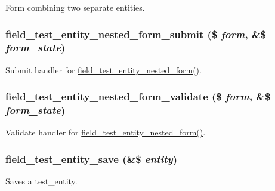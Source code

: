 \label{field__test_8entity_8inc_a8161d4c3065234379c6d6379ad71afbd}
Form combining two separate entities. \hypertarget{field__test_8entity_8inc_a2610999ccc4c08b9dc7c4ab45d1db366}{
\subsubsection[{field\_\-test\_\-entity\_\-nested\_\-form\_\-submit}]{\setlength{\rightskip}{0pt plus 5cm}field\_\-test\_\-entity\_\-nested\_\-form\_\-submit (\$ {\em form}, \/  \&\$ {\em form\_\-state})}}
\label{field__test_8entity_8inc_a2610999ccc4c08b9dc7c4ab45d1db366}
Submit handler for \hyperlink{field__test_8entity_8inc_a8161d4c3065234379c6d6379ad71afbd}{field\_\-test\_\-entity\_\-nested\_\-form()}. \hypertarget{field__test_8entity_8inc_a526966c6b74e25b6a5aa0b283f6a35a7}{
\subsubsection[{field\_\-test\_\-entity\_\-nested\_\-form\_\-validate}]{\setlength{\rightskip}{0pt plus 5cm}field\_\-test\_\-entity\_\-nested\_\-form\_\-validate (\$ {\em form}, \/  \&\$ {\em form\_\-state})}}
\label{field__test_8entity_8inc_a526966c6b74e25b6a5aa0b283f6a35a7}
Validate handler for \hyperlink{field__test_8entity_8inc_a8161d4c3065234379c6d6379ad71afbd}{field\_\-test\_\-entity\_\-nested\_\-form()}. \hypertarget{field__test_8entity_8inc_adb618b84348fcca91f26a3ba5900405a}{
\subsubsection[{field\_\-test\_\-entity\_\-save}]{\setlength{\rightskip}{0pt plus 5cm}field\_\-test\_\-entity\_\-save (\&\$ {\em entity})}}
\label{field__test_8entity_8inc_adb618b84348fcca91f26a3ba5900405a}
Saves a test\_\-entity.

